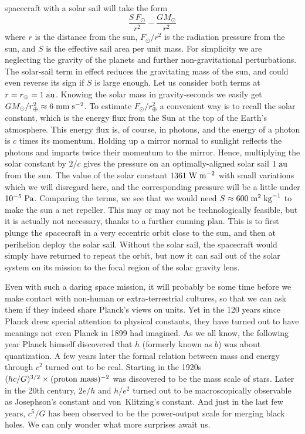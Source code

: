 \documentclass[aps,prb,12pt]{revtex4-1}
\def\unit#1{\;{\rm#1}}
\begin{document}
spacecraft with a solar sail will take the form
$$ \frac{S\,F_\odot}{r^2} - \frac{GM_\odot}{r^2} $$ where $r$ is the
distance from the sun, $F_\odot/r^2$ is the radiation pressure from
the sun, and $S$ is the effective sail area per unit mass.  For
simplicity we are neglecting the gravity of the planets and further
non-gravitational perturbations.  The solar-sail term in effect
reduces the gravitating mass of the sun, and could even reverse its
sign if $S$ is large enough.  Let us consider both terms at
$r=r_\oplus=1\unit{au}$.  Knowing the solar mass in gravity-seconds we
easily get $GM_\odot/r_\oplus^2\approx6\unit{mm}\unit{s}^{-2}$.  To
estimate $F_\odot/r_\oplus^2$ a convenient way is to recall the solar
constant, which is the energy flux from the Sun at the top of the
Earth's atmosphere.  This energy flux is, of course, in photons, and
the energy of a photon is $c$ times its momentum.  Holding up a mirror
normal to sunlight reflects the photons and imparts twice their
momentum to the mirror.  Hence, multiplying the solar constant by
$2/c$ gives the pressure on an optimally-aligned solar sail
$1\unit{au}$ from the sun.  The value of the solar constant
$1361\unit{W}\unit{m}^{-2}$ with small variations which we will
disregard here, and the corresponding pressure will be a little under
$10^{-5}\unit{Pa}$.  Comparing the terms, we see that we would need
$S\approx 600\unit{m}^2\unit{kg}^{-1}$ to make the sun a net repeller.
This may or may not be technologically feasible, but it is actually
not necessary, thanks to a further cunning plan.  This is to first
plunge the spacecraft in a very eccentric orbit close to the sun, and
then at perihelion deploy the solar sail.  Without the solar sail, the
spacecraft would simply have returned to repeat the orbit, but now it
can sail out of the solar system on its mission to the focal region of
the solar gravity lens.

Even with such a daring space mission, it will probably be some time
before we make contact with non-human or extra-terrestrial cultures,
so that we can ask them if they indeed share Planck's views on units.
Yet in the 120 years since Planck drew special attention to physical
constants, they have turned out to have meanings not even Planck in
1899 had imagined.  As we all know, the following year Planck himself
discovered that $h$ (formerly known as $b$) was about quantization.  A
few years later the formal relation between mass and energy through
$c^2$ turned out to be real.  Starting in the 1920s
$(hc/G)^{3/2}\times(\hbox{proton mass})^{-2}$ was discovered to be the
mass scale of stars.  Later in the 20th century, $2e/h$ and $h/e^2$
turned out to be macroscopically observable as Josephson's constant
and von~Klitzing's constant.  And just in the last few years, $c^5/G$
has been observed to be the power-output scale for merging black
holes.  We can only wonder what more surprises await us.

\def\aj{AJ}
\def\apjl{ApJL}
\def\aap{A\&A}
\def\mnras{MNRAS}
\def\pasp{PASP}



%
\end{document}
